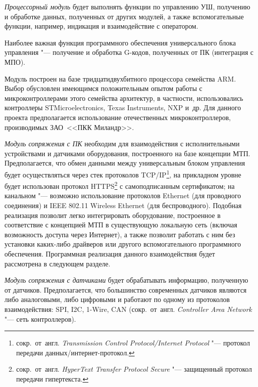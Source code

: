 \textit{Процессорный модуль} будет выполнять функции по управлению УШ, получению и обработке данных, полученных от других модулей, а также вспомогательные функции, например, индикация и взаимодействие с оператором.

Наиболее важная функция программного обеспечения универсального блока управления "--- получение и обработка G-кодов, полученных от ПК (интеграция с \foreignlanguage{english}{МПО}).

Модуль построен на базе тридцатидвухбитного процессора семейства \foreignlanguage{english}{ARM}. Выбор обусловлен имеющимся положительным опытом работы с микроконтроллерами этого семейства архитектур, в частности, использовались контроллеры \foreignlanguage{english}{STMicroelectronics}, \foreignlanguage{english}{Texas Instruments}, \foreignlanguage{english}{NXP} и~др. Для данного проекта предполагается использование отечественных микроконтроллеров, производимых ЗАО~<<ПКК Миландр>>.

\textit{Модуль сопряжения с ПК} необходим для взаимодействия с исполнительными устройствами и датчиками оборудования, построенного на базе концепции \foreignlanguage{english}{МТП}. Предполагается, что обмен данными между универсальным блоком управления будет осуществляться через стек протоколов \foreignlanguage{english}{TCP/IP}\footnote{сокр.~от~англ. \textit{Transmission Control Protocol/Internet Protocol} "--- протокол передачи данных/интернет-протокол.}, на прикладном уровне будет использован протокол \foreignlanguage{english}{HTTPS}\footnote{сокр.~от~англ. \textit{HyperText Transfer Protocol Secure} "--- защищенный протокол передачи гипертекста.} с самоподписанным сертификатом; на канальном "--- возможно использование протоколов \foreignlanguage{english}{Ethernet} (для проводного соединения) и IEEE 802.11 Wireless Ethernet (для беспроводного). Подобная реализация позволит легко интегрировать оборудование, построенное в соответствие с концепцией \foreignlanguage{english}{МТП} в существующую локальную сеть (включая возможность доступа через Интернет), а также позволит работать с ним без установки каких-либо драйверов или другого вспомогательного программного обеспечения. Программная реализация данного взаимодействия будет рассмотрена в следующем разделе.

\textit{Модуль сопряжения с датчиками} будет обрабатывать информацию, полученную от датчиков. Предполагается, что большинство современных датчиков являются либо аналоговыми, либо цифровыми и работают по одному из протоколов взаимодействия: \foreignlanguage{english}{SPI}, \foreignlanguage{english}{I}2\foreignlanguage{english}{C}, 1-\foreignlanguage{english}{Wire}, \foreignlanguage{english}{CAN} (сокр.~от~англ. \textit{Controller Area Network} "--- сеть контроллеров).

